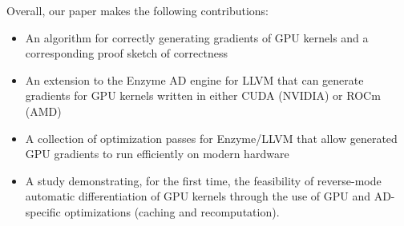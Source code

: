 Overall, our paper makes the following contributions:
\begin{itemize}
    \item An algorithm for correctly generating gradients of GPU kernels and a corresponding proof sketch of correctness
    \item An extension to the Enzyme AD engine for LLVM that can generate gradients for GPU kernels written in either CUDA (NVIDIA) or ROCm (AMD)
    \item A collection of optimization passes for Enzyme/LLVM that allow generated GPU gradients to run efficiently on modern hardware
    \item A study demonstrating, for the first time, the feasibility of reverse-mode automatic differentiation of GPU kernels through the use of GPU and AD-specific optimizations (cach\-ing and re\-computation).
\end{itemize}



